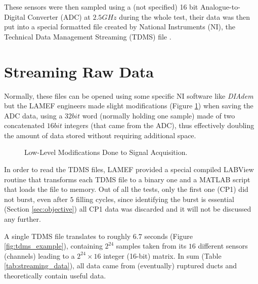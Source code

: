 These sensors were then sampled using a (not specified) 16 bit Analogue-to-Digital Converter (ADC) at $2.5 GHz$ during the whole test, their data was then put into a special formatted file created by National Instruments (NI), the Technical Data  Management Streaming (TDMS) file \cite{nationalinstrumentsNITDMSFile}. 


\section{Streaming Raw Data}\label{sec:streamingRawData}

Normally, these files can be opened using some specific NI software like \textit{DIAdem} but the LAMEF engineers made slight modifications (Figure \ref{fig:lamef_mods}) when saving the ADC data, using a $32 bit$ word (normally holding one sample) made of two concatenated $16 bit$ integers (that came from the ADC), thus effectively doubling the amount of data stored without requiring additional space.

\begin{figure}[H]
	\centering
	\def\svgwidth{0.7\columnwidth}
	
	\caption{Low-Level Modifications Done to Signal Acquisition.}
	\label{fig:lamef_mods}
\end{figure}


In order to read the TDMS files, LAMEF provided a special compiled LABView routine that transforms each TDMS file to a binary one and a MATLAB script that loads the file to memory. Out of all the tests, only the first one (CP1) did not burst, even after $5$ filling cycles, since identifying the burst is essential (Section \ref{sec:objective}) all CP1 data was discarded and it will not be discussed any further.

A single TDMS file translates to roughly $6.7$ seconds (Figure \ref{fig:tdms_example}), containing $2^{24}$ samples taken from its $16$ different sensors (channels) leading to a $2^{24} \times 16$ integer (16-bit) matrix. In sum (Table \ref{tab:streaming_data}), all data came from (eventually) ruptured ducts and theoretically contain useful data.

